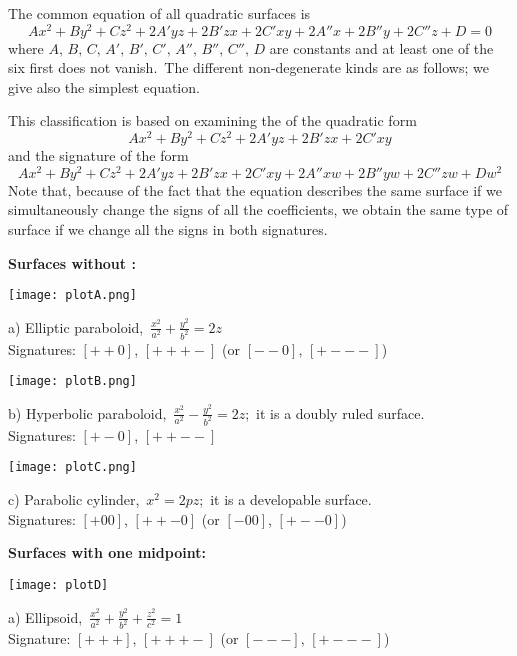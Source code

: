 \documentclass[12pt]{article}
\begin{document}
 
The common equation of all quadratic surfaces is
    \[Ax^2+By^2+Cz^2+2A'yz+2B'zx+2C'xy+2A''x+2B''y+2C''z+D = 0\]
where $A,\,B,\,C,\,A',\,B',\,C',\,A'',\,B'',\,C'',\,D$ are constants and at least one of the six first does not vanish.\, The different non-degenerate kinds are as follows; we give also the simplest equation.

This classification is based on examining the  of the quadratic form
 \[Ax^2+By^2+Cz^2+2A'yz+2B'zx+2C'xy\]
and the signature of the form
 \[Ax^2+By^2+Cz^2+2A'yz+2B'zx+2C'xy+2A''xw+2B''yw+2C''zw+Dw^2\]
Note that, because of the fact that the equation describes the same surface if we simultaneously change the signs of all the coefficients, we obtain the same type of surface if we change all the signs in both signatures. 

\textbf{Surfaces without :}

\begin{center}
\texttt{[image: plotA.png]}

a) Elliptic paraboloid, \,$\frac{x^2}{a^2}+\frac{y^2}{b^2} = 2z$ \\
Signatures: $[++0]$, $[+++-]$ (or $[--0]$, $[+---]$)
\end{center}
\bigskip

\begin{center}
\texttt{[image: plotB.png]}

b) Hyperbolic paraboloid, \,$\frac{x^2}{a^2}-\frac{y^2}{b^2} = 2z$;\, it is a doubly ruled surface. \\
Signatures: $[+-0]$, $[++--]$
\end{center}
\bigskip

\begin{center}
\texttt{[image: plotC.png]}

c) Parabolic cylinder, \,$x^2 = 2pz$;\, it is a developable surface. \\
Signatures:  $[+00]$, $[++-0]$ (or $[-00]$, $[+--0]$)
\end{center}
\bigskip

\textbf{Surfaces with one midpoint:}

\begin{center}
\texttt{[image: plotD]}

a) Ellipsoid, \,$\frac{x^2}{a^2}+\frac{y^2}{b^2}+\frac{z^2}{c^2} = 1$ \\
Signature: $[+++]$, $[+++-]$ (or $[---]$, $[+---]$)
\end{center}
\bigskip
\end{document}
